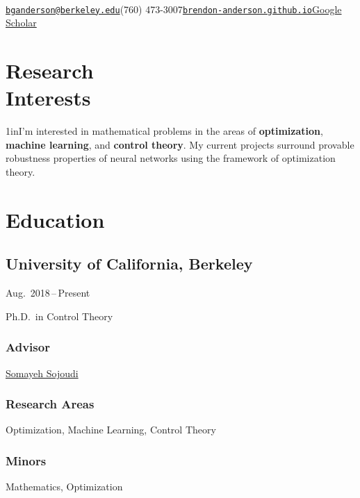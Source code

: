 \documentclass[11pt]{article}
\newcommand{\sectionwidth}{1in}		%
\renewcommand{\maketitle}{%
	\begin{center}
		{\huge\bfseries\theauthor}\\
		\vspace*{1em}%
		{\href{mailto:\theemail}{\texttt{\theemail}}\quad\thephone\quad\href{https://\thewebsite}{\texttt{\thewebsite}}\quad\href{\thescholar}{Google Scholar}}\\
		\vspace*{0em}%
	\end{center}%
}							%
\newcommand{\cvdates}[2]{\hfill#1\,--\,#2}	%
\begin{document}
	
	\title{}
	\date{}
	\author{Brendon G.\ Anderson}
	\newcommand{\theemail}{bganderson@berkeley.edu}
	\newcommand{\thephone}{(760) 473-3007}
	\newcommand{\thewebsite}{brendon-anderson.github.io}
	\newcommand{\thescholar}{https://scholar.google.com/citations?user=-zepUjMAAAAJ&hl=en&oi=ao}
	\maketitle

	\section{\texorpdfstring{Research \\[\baselineskip] Interests}{Research Interests}}
	\hfill\vspace*{-2\baselineskip}

	\begin{adjustwidth}{\sectionwidth}{}I'm interested in mathematical problems in the areas of \textbf{optimization}, \textbf{machine learning}, and \textbf{control theory}. My current projects surround provable robustness properties of neural networks using the framework of optimization theory.\end{adjustwidth}
	
	\section{Education}
	\subsection{University of California, Berkeley}
	\cvdates{Aug.\ 2018}{Present}
	
	\hspace*{\sectionwidth}Ph.D.\ in Control Theory
	
	\subsubsection{Advisor}
	\href{https://people.eecs.berkeley.edu/~sojoudi/}{Somayeh Sojoudi}
	
	\subsubsection{Research Areas}
	Optimization, Machine Learning, Control Theory
	
	\subsubsection{Minors}
	Mathematics, Optimization
	
\end{document}
